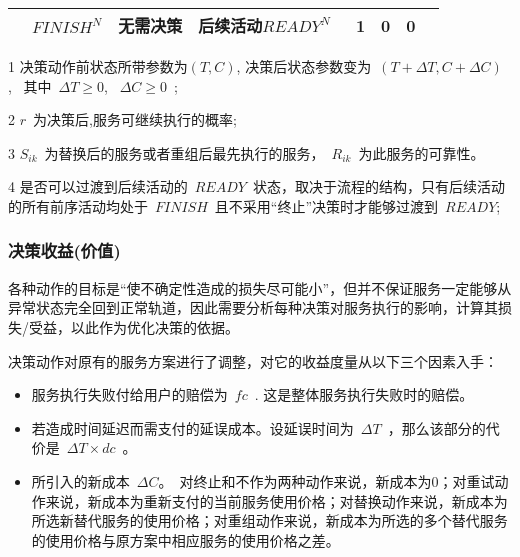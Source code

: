 \begin{table}[htbp]
\begin{threeparttable}
\begin{tabular}{llllllll}
            \multicolumn{1}{c}{} 
            & $FINISH^N$
            & \multicolumn{1}{c}{无需决策} 
            & \multicolumn{1}{l}{后续活动$READY^N$~\tnote{4}} 
            & \multicolumn{1}{c}{1} 
            & \multicolumn{1}{c}{0} 
            & \multicolumn{1}{c}{0} \\
            \bottomrule
            
        \end{tabular}%
        \begin{tablenotes}
            \item[1] 决策动作前状态所带参数为$(T,C)$, 决策后状态参数变为~$(T+\Delta T, C+\Delta C)$,~ 其中~$\Delta T \ge 0$, ~$\Delta C \ge 0$~; 
            \item[2] $r$~为决策后,服务可继续执行的概率;
            \item[3] $S_{ik}$~为替换后的服务或者重组后最先执行的服务，~$R_{ik}$~为此服务的可靠性。
            \item[4] 是否可以过渡到后续活动的~$READY$~状态，取决于流程的结构，只有后续活动的所有前序活动均处于~$FINISH$~且不采用“终止”决策时才能够过渡到~$READY$;
        \end{tablenotes}
    \end{threeparttable}
\end{table}%

\subsubsection{决策收益(价值)}

各种动作的目标是“使不确定性造成的损失尽可能小”，但并不保证服务一定能够从异常状态完全回到正常轨道，因此需要分析每种决策对服务执行的影响，计算其损失/受益，以此作为优化决策的依据。

决策动作对原有的服务方案进行了调整，对它的收益度量从以下三个因素入手：

\begin{itemize}

\item 服务执行失败付给用户的赔偿为~$fc$~. 这是整体服务执行失败时的赔偿。

\item 若造成时间延迟而需支付的延误成本。设延误时间为~$\Delta T$~，那么该部分的代价是~$\Delta T \times dc$~。

\item 所引入的新成本~$\Delta C$。~对终止和不作为两种动作来说，新成本为0；对重试动作来说，新成本为重新支付的当前服务使用价格；对替换动作来说，新成本为所选新替代服务的使用价格；对重组动作来说，新成本为所选的多个替代服务的使用价格与原方案中相应服务的使用价格之差。

\end{itemize}

